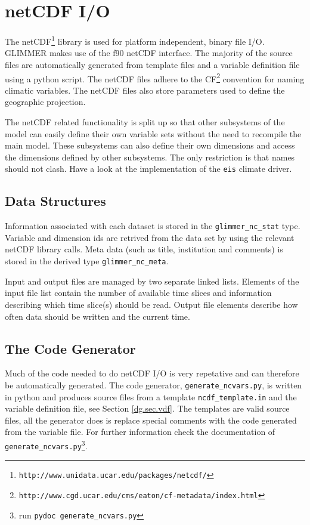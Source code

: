 \section{netCDF I/O}
The netCDF\footnote{\texttt{http://www.unidata.ucar.edu/packages/netcdf/}} library is used for platform independent, binary file I/O. GLIMMER makes use of the f90 netCDF interface. The majority of the source files are automatically generated from template files and a variable definition file using a python script. The netCDF files adhere to the CF\footnote{\texttt{http://www.cgd.ucar.edu/cms/eaton/cf-metadata/index.html}} convention for naming climatic variables. The netCDF files also store parameters used to define the geographic projection.

The netCDF related functionality is split up so that other subsystems of the model can easily define their own variable sets without the need to recompile the main model. These subsystems can also define their own dimensions and access the dimensions defined by other subsystems. The only restriction is that names should not clash. Have a look at the implementation of the \texttt{eis} climate driver.
\subsection{Data Structures}
Information associated with each dataset is stored in the \texttt{glimmer\_nc\_stat} type. Variable and dimension ids are retrived from the data set by using the relevant netCDF library calls. Meta data (such as title, institution and comments) is stored in the derived type \texttt{glimmer\_nc\_meta}.

Input and output files are managed by two separate linked lists. Elements of the input file list contain the number of available time slices and information describing which time slice(s) should be read. Output file elements describe how often data should be written and the current time.

\subsection{The Code Generator}
Much of the code needed to do netCDF I/O is very repetative and can therefore be automatically generated. The code generator, \texttt{generate\_ncvars.py}, is written in python and produces source files from a template \texttt{ncdf\_template.in} and the variable definition file, see Section \ref{dg.sec.vdf}. The templates are valid source files, all the generator does is replace special comments with the code generated from the variable file. For further information check the documentation of \texttt{generate\_ncvars.py}\footnote{run \texttt{pydoc generate\_ncvars.py}}.

